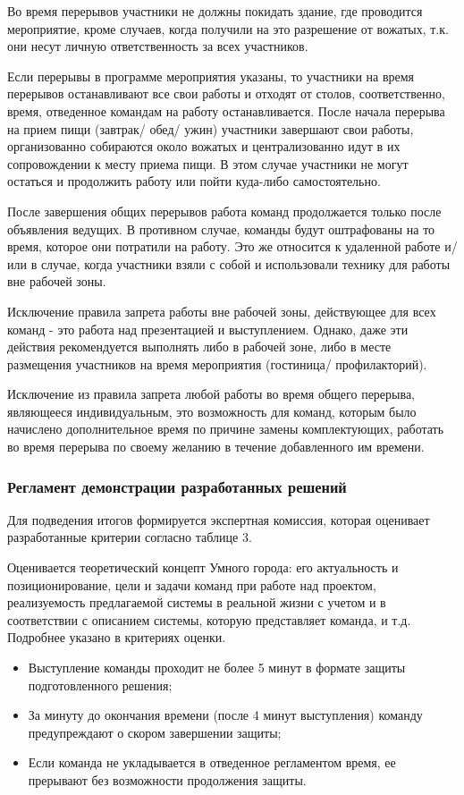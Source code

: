 Во время перерывов участники не должны покидать здание, где проводится мероприятие, кроме случаев, когда получили на это разрешение от вожатых, т.к. они несут личную ответственность за всех участников. 

Если перерывы в программе мероприятия указаны, то участники на время перерывов останавливают все свои работы и отходят от столов, соответственно, время, отведенное командам на работу останавливается. После начала перерыва на прием пищи (завтрак/ обед/ ужин) участники завершают свои работы, организованно собираются около вожатых и централизованно идут в их сопровождении к месту приема пищи. В этом случае участники не могут остаться и продолжить работу или пойти куда-либо самостоятельно.

После завершения общих перерывов работа команд продолжается только после объявления ведущих. В противном случае, команды будут оштрафованы на то время, которое они потратили на работу. Это же относится к удаленной работе и/или в случае, когда участники взяли с собой и использовали технику для работы вне рабочей зоны.

Исключение правила запрета работы вне рабочей зоны, действующее для всех команд - это работа над презентацией и выступлением. Однако, даже эти действия рекомендуется выполнять либо в рабочей зоне, либо в месте размещения участников на время мероприятия (гостиница/ профилакторий).

Исключение из правила запрета любой работы во время общего перерыва, являющееся индивидуальным, это возможность для команд, которым было начислено дополнительное время по причине замены комплектующих, работать во время перерыва по своему желанию в течение добавленного им времени.

\subsubsection*{Регламент демонстрации разработанных решений} 

Для подведения итогов формируется экспертная комиссия, которая оценивает разработанные критерии согласно таблице 3. 

Оценивается теоретический концепт Умного города: его актуальность и позиционирование, цели и задачи команд при работе над проектом, реализуемость предлагаемой системы в реальной жизни с учетом и в соответствии с описанием системы, которую представляет команда, и т.д. Подробнее указано в критериях оценки.

\begin{itemize}
    \item Выступление команды проходит не более 5 минут в формате защиты подготовленного решения;
    \item За минуту до окончания времени (после 4 минут выступления) команду предупреждают о скором завершении защиты;
    \item Если команда не укладывается в отведенное регламентом время, ее прерывают без возможности продолжения защиты.     
\end{itemize}

